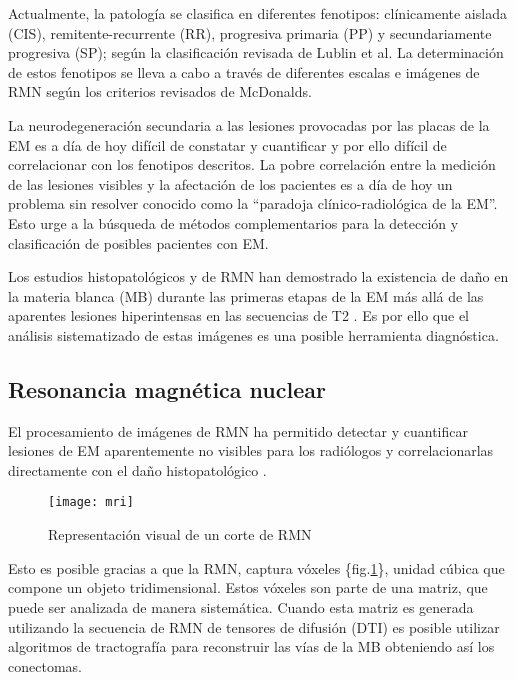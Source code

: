\documentclass[fleqn,10pt]{UICArticle} %
\begin{document}
Actualmente, la patología se clasifica en diferentes fenotipos: clínicamente aislada (CIS), remitente-recurrente (RR), progresiva primaria (PP) y secundariamente progresiva (SP); según la clasificación revisada de Lublin et al\cite{Lublin2014}. La determinación de estos fenotipos se lleva a cabo a través de diferentes escalas e imágenes de RMN según los criterios revisados de McDonalds\cite{Polman20112}.

La neurodegeneración secundaria a las lesiones provocadas por las placas de la EM es a día de hoy difícil de constatar y cuantificar y por ello difícil de correlacionar con los fenotipos descritos. La pobre correlación entre la medición de las lesiones visibles y la afectación de los pacientes es a día de hoy un problema sin resolver conocido como la “paradoja clínico-radiológica de la EM”. Esto urge a la búsqueda de métodos complementarios para la detección y clasificación de posibles pacientes con EM.

Los estudios histopatológicos y de RMN han demostrado la existencia de daño en la materia blanca (MB) durante las primeras etapas de la EM más allá de las aparentes lesiones hiperintensas en las secuencias de T2 \cite{Beer2016}. Es por ello que el análisis sistematizado de estas imágenes es una posible herramienta diagnóstica.

\subsection{Resonancia magnética nuclear}

El procesamiento de imágenes de RMN ha permitido detectar y cuantificar lesiones de EM aparentemente no visibles para los radiólogos y correlacionarlas directamente con el daño histopatológico \cite{Beer2016}.

\begin{figure}[ht]
	\centering
	\texttt{[image: mri]}
	\caption{Representación visual de un corte de RMN}
	\label{fig:voxeles}
\end{figure}

Esto es posible gracias a que la RMN, captura vóxeles \{fig.\ref{fig:voxeles}\}, unidad cúbica que compone un objeto tridimensional. Estos vóxeles son parte de una matriz, que puede ser analizada de manera sistemática. Cuando esta matriz es generada utilizando la secuencia de RMN de tensores de difusión (DTI) es posible utilizar algoritmos de tractografía para reconstruir las vías de la MB obteniendo así los conectomas.
\end{document}
